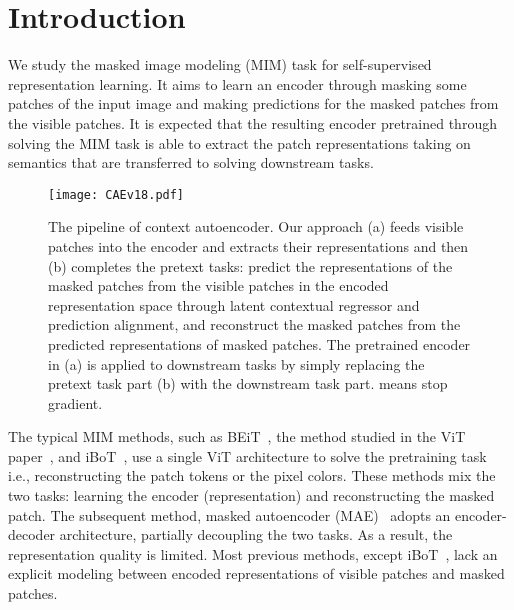 \documentclass[twocolumn]{svjour3}          \smartqed  \usepackage{graphicx}
\begin{document}

\section{Introduction}\label{sec1}






We study the masked image modeling (MIM) task 
for self-supervised representation learning.
It aims to learn an encoder
through masking some patches of the
input image and 
making predictions for the masked patches
from the visible patches.
It is expected that
the resulting encoder 
pretrained through solving the MIM task 
is able to extract the patch representations
taking on semantics
that are transferred to solving downstream tasks.

\begin{figure}[t]
\centering
\centerline{\texttt{[image: CAEv18.pdf]}}
\caption{The pipeline of context autoencoder.
Our approach 
(a) feeds visible patches into
the encoder
and extracts their representations 
and then (b) completes the pretext tasks:
predict
the representations 
of the masked patches
from the visible patches
in the encoded representation space
through 
latent contextual regressor and prediction alignment,
and reconstruct the masked patches from the predicted 
representations 
of masked patches.
The pretrained encoder in (a) 
is applied to downstream tasks
by simply replacing the pretext task part
(b)
with the downstream task part.
 means stop gradient.
}
\label{fig:CAE}
\end{figure}

The typical MIM methods,
such as 
BEiT~\cite{bao2021beit},
the method studied in the ViT paper~\cite{DosovitskiyB0WZ21},
and iBoT~\cite{zhou2021ibot},
use a single ViT architecture 
to solve the pretraining task i.e., reconstructing the patch tokens or the pixel colors.
These methods mix the two tasks: learning the encoder (representation)
and reconstructing the masked patch.
The subsequent method,
masked autoencoder (MAE)~\cite{he2021masked}
adopts an encoder-decoder architecture,
partially decoupling the two tasks.
As a result,
the representation quality is limited.
Most previous methods, except iBoT~\cite{zhou2021ibot}, lack an explicit modeling
between encoded representations 
of visible patches and masked patches.
\end{document}
